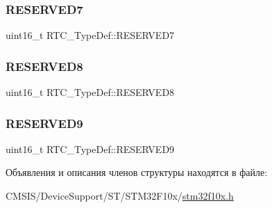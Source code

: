 \mbox{\label{struct_r_t_c___type_def_abb8597ac192c0d24ab6b13b031a34d37}} 
\subsubsection{\texorpdfstring{RESERVED7}{RESERVED7}}
{\footnotesize\ttfamily uint16\+\_\+t R\+T\+C\+\_\+\+Type\+Def\+::\+R\+E\+S\+E\+R\+V\+E\+D7}

\mbox{\label{struct_r_t_c___type_def_a5b09d77c801dc948581ef113d8a352c9}} 
\subsubsection{\texorpdfstring{RESERVED8}{RESERVED8}}
{\footnotesize\ttfamily uint16\+\_\+t R\+T\+C\+\_\+\+Type\+Def\+::\+R\+E\+S\+E\+R\+V\+E\+D8}

\mbox{\label{struct_r_t_c___type_def_a3f83ce9cfda0c0e7f854ab65347058b1}} 
\subsubsection{\texorpdfstring{RESERVED9}{RESERVED9}}
{\footnotesize\ttfamily uint16\+\_\+t R\+T\+C\+\_\+\+Type\+Def\+::\+R\+E\+S\+E\+R\+V\+E\+D9}



Объявления и описания членов структуры находятся в файле\+:\begin{DoxyCompactItemize}
\item 
C\+M\+S\+I\+S/\+Device\+Support/\+S\+T/\+S\+T\+M32\+F10x/\mbox{\hyperlink{stm32f10x_8h}{stm32f10x.\+h}}\end{DoxyCompactItemize}
